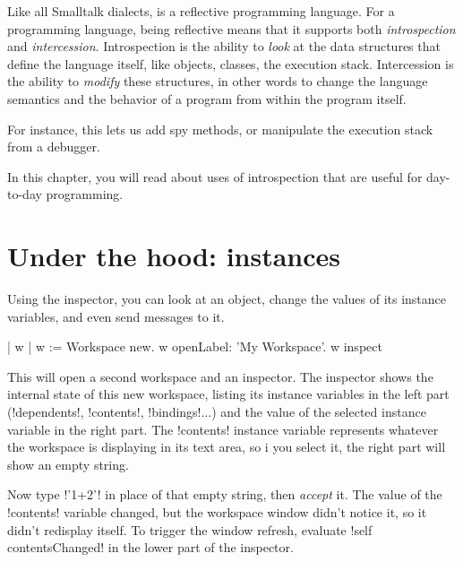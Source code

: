 \documentclass[a4paper,10pt,twoside]{book}
\begin{document}
Like all Smalltalk dialects, \squeak is a reflective programming language.
For a programming language, being reflective means that it supports both \emph{introspection} and \emph{intercession}.
Introspection is the ability to \emph{look} at the data structures that define the language itself, like objects, classes, the execution stack.
Intercession is the ability to \emph{modify} these structures, in other words to change the language semantics and the behavior of a program from within the program itself.

For instance, this lets us add spy methods, or manipulate the execution stack from a debugger.

In this chapter, you will read about uses of introspection that are useful for day-to-day programming.

\section{Under the hood: instances} %

Using the inspector, you can look at an object, change the values of its instance variables, and even send messages to it.

\begin{code}{| w |}
w := Workspace new.
w openLabel: 'My Workspace'.
w inspect
\end{code}

This will open a second workspace and an inspector.
The inspector shows the internal state of this new workspace, listing its instance variables in the left part (\ct!dependents!, \ct!contents!, \ct!bindings!...) and the value of the selected instance variable in the right part.
The \ct!contents! instance variable represents whatever the workspace is displaying in its text area, so i you select it, the right part will show an empty string.



Now type \ct!'1+2'! in place of that empty string, then \emph{accept} it.
The value of the \ct!contents! variable changed, but the workspace window didn't notice it, so it didn't redisplay itself.
To trigger the window refresh, evaluate \ct!self contentsChanged! in the lower part of the inspector. 
\end{document}
